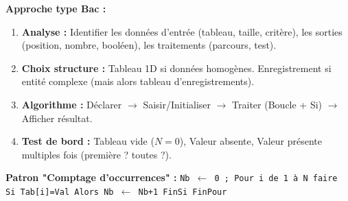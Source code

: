 \documentclass[11pt]{article}
\begin{document}
\begin{methode}
\textbf{Approche type Bac :}
\begin{enumerate}
    \item \textbf{Analyse :} Identifier les données d'entrée (tableau, taille, critère), les sorties (position, nombre, booléen), les traitements (parcours, test).
    \item \textbf{Choix structure :} Tableau 1D si données homogènes. Enregistrement si entité complexe (mais alors tableau d'enregistrements).
    \item \textbf{Algorithme :} Déclarer $\rightarrow$ Saisir/Initialiser $\rightarrow$ Traiter (Boucle + Si) $\rightarrow$ Afficher résultat.
    \item \textbf{Test de bord :} Tableau vide ($N=0$), Valeur absente, Valeur présente multiples fois (première ? toutes ?).
\end{enumerate}
\medskip
\textbf{Patron "Comptage d'occurrences" :}
\texttt{Nb $\leftarrow$ 0 ; Pour i de 1 à N faire Si Tab[i]=Val Alors Nb $\leftarrow$ Nb+1 FinSi FinPour}
\end{methode}
\end{document}
